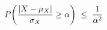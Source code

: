 \documentclass[preview]{standalone}
\begin{document}
\begin{align*}
\special{dvisvgm:raw <g id='unique000'>}P\!\left(\frac{|X-\mu_X|}{\sigma_X}\geq\alpha\right)\;\leq\;\frac{1}{\alpha^2}\special{dvisvgm:raw </g>}
\end{align*}
\end{document}
